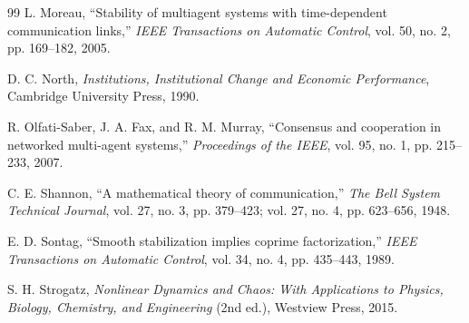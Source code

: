 \documentclass[11pt,a4paper]{article}
\theoremstyle{definition}
\begin{document}
\begin{thebibliography}{99}
 L. Moreau, ``Stability of multiagent systems with time-dependent communication links,'' \textit{IEEE Transactions on Automatic Control}, vol. 50, no. 2, pp. 169--182, 2005.

 D. C. North, \textit{Institutions, Institutional Change and Economic Performance}, Cambridge University Press, 1990.

 R. Olfati-Saber, J. A. Fax, and R. M. Murray, ``Consensus and cooperation in networked multi-agent systems,'' \textit{Proceedings of the IEEE}, vol. 95, no. 1, pp. 215--233, 2007.

 C. E. Shannon, ``A mathematical theory of communication,'' \textit{The Bell System Technical Journal}, vol. 27, no. 3, pp. 379--423; vol. 27, no. 4, pp. 623--656, 1948.

 E. D. Sontag, ``Smooth stabilization implies coprime factorization,'' \textit{IEEE Transactions on Automatic Control}, vol. 34, no. 4, pp. 435--443, 1989.

 S. H. Strogatz, \textit{Nonlinear Dynamics and Chaos: With Applications to Physics, Biology, Chemistry, and Engineering} (2nd ed.), Westview Press, 2015.

\end{thebibliography}
\end{document}
